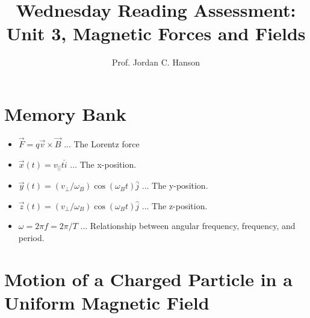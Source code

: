 \documentclass{article}
\begin{document}
\title{Wednesday Reading Assessment: Unit 3, Magnetic Forces and Fields}
\author{Prof. Jordan C. Hanson}

\maketitle

\section{Memory Bank}

\begin{itemize}
\item $\vec{F} = q\vec{v} \times \vec{B}$ ... The Lorentz force
\item $\vec{x}(t) = v_{||}t \hat{i}$ ... The x-position.
\item $\vec{y}(t) = (v_{\perp}/\omega_B) \cos(\omega_B t)\hat{j}$ ... The y-position.
\item $\vec{z}(t) = (v_{\perp}/\omega_B) \cos(\omega_B t)\hat{j}$ ... The z-position.
\item $\omega = 2 \pi f = 2\pi /T$ ... Relationship between angular frequency, frequency, and period.
\end{itemize}

\section{Motion of a Charged Particle in a Uniform Magnetic Field}
\end{document}
